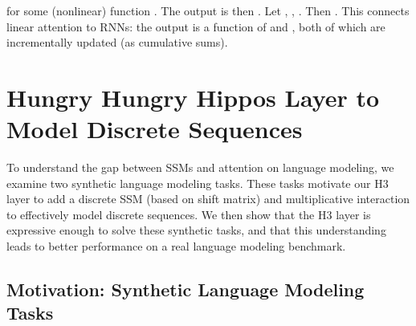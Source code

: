 \documentclass{article}
\newcommand{\hthree}{\textsc{H3}\xspace}
\begin{document}
for some (nonlinear) function .
The output is then .
Let
, , .
Then .
This connects linear attention to RNNs: the output  is a function of 
and , both of which are incrementally updated (as cumulative sums).

 

\section{Hungry Hungry Hippos Layer to Model Discrete Sequences}
\label{sec:method}

To understand the gap between SSMs and attention on language modeling, we
examine two synthetic language modeling tasks.
These tasks motivate our \hthree layer to add a discrete SSM (based on shift matrix) and multiplicative interaction to effectively model discrete sequences.
We then show that the \hthree layer is expressive enough to solve these synthetic tasks, and that this understanding leads to better performance on a real language modeling benchmark.

\subsection{Motivation: Synthetic Language Modeling Tasks\label{sec:synthetics}}
\end{document}
